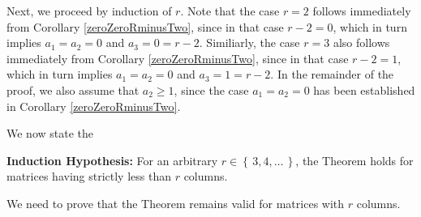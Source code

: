 \vskip 0.5cm
\noindent
Next, we proceed by induction of $r$.
Note that the case $r = 2$ follows immediately from Corollary \ref{zeroZeroRminusTwo},
since in that case $r - 2 = 0$, which in turn implies $a_{1} = a_{2} = 0$ and $a_{3} = 0 = r - 2$.
Similiarly, the case $r = 3$ also follows immediately from Corollary \ref{zeroZeroRminusTwo},
since in that case $r - 2 = 1$, which in turn implies $a_{1} = a_{2} = 0$ and $a_{3} = 1 = r - 2$.
In the remainder of the proof, we also assume that $a_{2} \geq 1$, since the case
$a_{1} = a_{2} = 0$ has been established in Corollary \ref{zeroZeroRminusTwo}.

\vskip 0.5cm
\noindent
We now state the
\begin{center}
\begin{minipage}{6.0in}
\textbf{Induction Hypothesis:}
\vskip 0.03cm
\noindent
For an arbitrary $r \in \left\{\,3,4,\ldots\,\right\}$, the Theorem holds for matrices having strictly less than $r$ columns.
\end{minipage}
\end{center}
We need to prove that the Theorem remains valid for matrices with $r$ columns.

